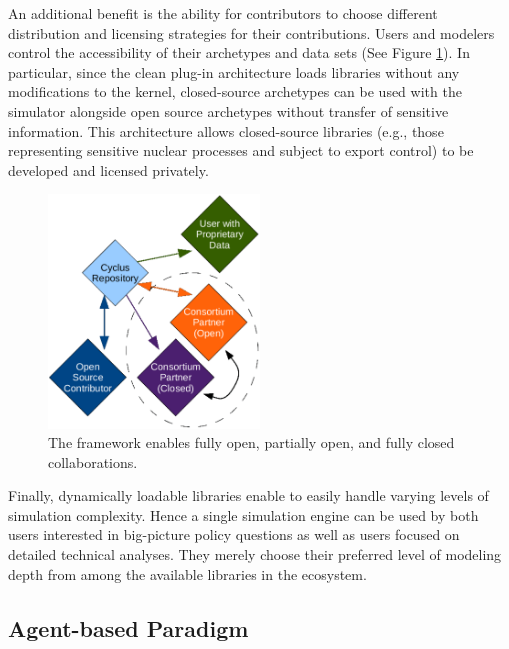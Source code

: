 An additional benefit is the ability for
contributors to choose different distribution and licensing strategies
for their contributions. Users and modelers control the accessibility of their archetypes and data sets (See Figure \ref{fig:modifiedopen}).
In particular, since the clean plug-in architecture loads libraries without any
modifications to the \Cyclus kernel, closed-source archetypes can be used with
the simulator alongside open source archetypes without transfer of sensitive information. This architecture
allows closed-source libraries (e.g., those representing sensitive nuclear
processes and subject to export control) to be developed and licensed privately.

\begin{figure}[htbp!]
\begin{center}
\includegraphics[width=0.5\textwidth]{./images/modifiedopen.eps}
\end{center}
\caption{The \Cyclus framework enables fully open, partially open, and fully
closed collaborations\cite{carlsen_cyclus_2014}.}
\label{fig:modifiedopen}
\end{figure}

Finally, dynamically loadable libraries enable \Cyclus to easily handle varying levels of simulation complexity. Hence a single
simulation engine can be used by both users interested in big-picture policy
questions as well as users focused on detailed technical
analyses. They merely choose their preferred level of modeling depth from among the
available libraries in the ecosystem.

\subsection{Agent-based Paradigm}
\label{sec:abm}

